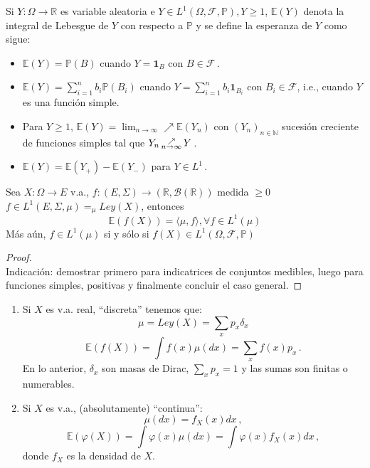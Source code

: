 \begin{definition}[Esperanza]
Si $Y:\Omega \longrightarrow \mathbb{R}$ es variable aleatoria e $Y\in L^1(\Omega,\mathcal{F},\mathbb{P}), Y\geq1$, $\mathbb{E}(Y)$ denota la integral de Lebesgue de $Y$ con respecto a $\mathbb{P}$ y se define la esperanza de $Y$ como sigue:

\begin{itemize}
    \item $\mathbb{E}(Y)=\mathbb{P}(B)$ cuando $Y=\mathbf{1}_B$ con $B \in \mathcal{F}$\,.
    \item $\displaystyle\mathbb{E}(Y)=\sum^n_{i=1} b_i \mathbb{P}(B_i)$ cuando $\displaystyle Y=\sum^n_{i=1}b_i\mathbf{1}_{B_i}$ con $B_i \in \mathcal{F}$, i.e., cuando $Y$ es una función simple.
    \item Para $Y\geq1$, $\mathbb{E}(Y) = \displaystyle \lim_{n\rightarrow \infty} \nearrow \mathbb{E}(Y_n)$ con $(Y_n)_{n \in \mathbb{N}}$ sucesión creciente de funciones simples tal que $Y_n \displaystyle \,\substack{\nearrow \\ \tiny{n\to\infty}}\, Y$\,.
    \item $\mathbb{E}(Y) = \mathbb{E}(Y_+)-\mathbb{E}(Y_-)$ para $Y\in L^1$\,.
\end{itemize}
\end{definition}

\begin{proposition}
Sea $X:\Omega \longrightarrow E $ v.a., $f:(E,\Sigma)\longrightarrow (\mathbb{R},\mathcal{B(\mathbb{R})})$ medida $\geq 0$ $f\in L^1(E,\Sigma,\mu) =_\mu Ley(X)$, entonces
$$ \mathbb{E}(f(X)) = \langle \mu,f \rangle, \forall f \in L^1(\mu)$$
Más aún, $f\in L^1(\mu)$ si y sólo si $f(X) \in L^1(\Omega,\mathcal{F},\mathbb{P})$
\end{proposition}
\begin{proof}
\ejercicio
\gris \\
Indicación: demostrar primero para indicatrices de conjuntos medibles, luego para funciones simples, positivas y finalmente concluir el caso general. \negro
\end{proof}

\begin{remark}
\beforeitemize
\begin{enumerate}
    \item Si $X$ es v.a. real, ``discreta'' tenemos que:
    $$ \mu=Ley(X) = \sum_x p_x\delta_x$$
    $$\mathbb{E}(f(X)) = \int f(x)\mu(dx) = \sum_x f(x)p_x \, .$$
    En lo anterior, $\delta_x$ son masas de Dirac, $\sum_xp_x = 1$ y las sumas son finitas o numerables.
    \item Si $X$ es v.a., (absolutamente) ``continua'':
    $$ \mu(dx) = f_X(x)dx \, ,$$ 
    $$ \mathbb{E}(\varphi(X))=\int \varphi(x)\mu(dx)=\int\varphi(x) f_X(x)dx \, ,$$
    donde $f_X$ es la densidad de $X$.
\end{enumerate}
\end{remark}

